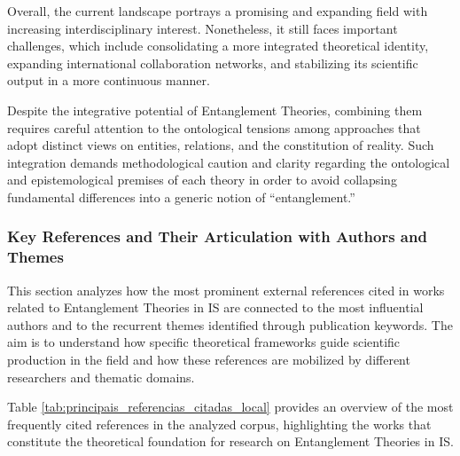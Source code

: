 Overall, the current landscape portrays a promising and expanding field with increasing interdisciplinary interest. Nonetheless, it still faces important challenges, which include consolidating a more integrated theoretical identity, expanding international collaboration networks, and stabilizing its scientific output in a more continuous manner.

Despite the integrative potential of Entanglement Theories, combining them requires careful attention to the ontological tensions among approaches that adopt distinct views on entities, relations, and the constitution of reality. Such integration demands methodological caution and clarity regarding the ontological and epistemological premises of each theory in order to avoid collapsing fundamental differences into a generic notion of ``entanglement.''

\subsubsection{Key References and Their Articulation with Authors and Themes}\label{subsec:autres_temas}

This section analyzes how the most prominent external references cited in works related to Entanglement Theories in IS are connected to the most influential authors and to the recurrent themes identified through publication keywords. The aim is to understand how specific theoretical frameworks guide scientific production in the field and how these references are mobilized by different researchers and thematic domains.

Table \ref{tab:principais_referencias_citadas_local} provides an overview of the most frequently cited references in the analyzed corpus, highlighting the works that constitute the theoretical foundation for research on Entanglement Theories in IS.

